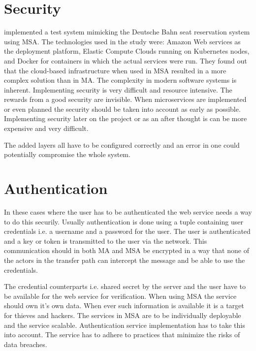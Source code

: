 \section{Security}
\begin{sloppypar}
    \citet{secconmsa} implemented a test system mimicking the Deutsche Bahn 
    seat reservation system using MSA. The technologies used in the study were: 
    Amazon Web services as the deployment platform, Elastic Compute Clouds 
    running on Kubernetes nodes, and Docker for containers in which the actual 
    services were run. They found out that the cloud-based infrastructure when 
    used in MSA resulted in a more complex solution than in MA. The complexity 
    in modern software systems is inherent. Implementing security is very 
    difficult and resource intensive. The rewards from a good security are 
    invisible. When microservices are implemented or even planned the security 
    should be taken into account as early as possible. Implementing security 
    later on the project or as an after thought is can be more expensive and 
    very difficult.
\end{sloppypar}
\begin{sloppypar}
    The added layers all have to be configured correctly and an error in one 
    could potentially compromise the whole system. 
\end{sloppypar}

\section{Authentication}
\begin{sloppypar}
    In these cases where the user has to be authenticated the web service needs 
    a way to do this securily. Usually authentication is done using a tuple 
    containing user credentials i.e. a username and a password for the user. The
    user is authenticated and a key or token is transmitted to the user via the 
    network. This communication should in both MA and MSA be encrypted in a way 
    that none of the actors in the transfer path can intercept the message and 
    be able to use the credentials.
\end{sloppypar}
\begin{sloppypar}
    The credential counterparts i.e. shared secret by the server and the user 
    have to be available for the web service for verification. When using MSA 
    the service should own it's own data. When ever such information is 
    available it is a target for thieves and hackers. The services in MSA are 
    to be individually deployable and the service scalable. Authentication 
    service implementation has to take this into account. The service has to 
    adhere to practices that minimize the risks of data breaches. 
\end{sloppypar}

